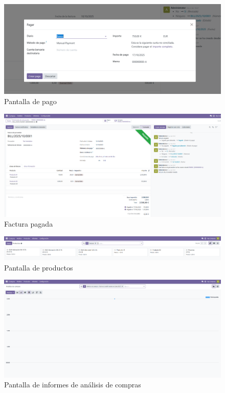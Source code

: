 \documentclass[a4paper,12pt]{article}
\begin{document}
\begin{figure}[h!]
    \centering
    \includegraphics[width=1\textwidth]{pr2odoo34-pantallaPago.png}
    \caption{Pantalla de pago}
\end{figure}
\FloatBarrier

\begin{figure}[h!]
    \centering
    \includegraphics[width=1\textwidth]{pr2odoo35-facturaPagada.png}
    \caption{Factura pagada}
\end{figure}
\FloatBarrier

\begin{figure}[h!]
    \centering
    \includegraphics[width=1\textwidth]{pr2odoo36-pantallaProductos.png}
    \caption{Pantalla de productos}
\end{figure}
\FloatBarrier

\begin{figure}[h!]
    \centering
    \includegraphics[width=1\textwidth]{pr2odoo37-analisisCompras.png}
    \caption{Pantalla de informes de análisis de compras}
\end{figure}
\FloatBarrier
\end{document}
